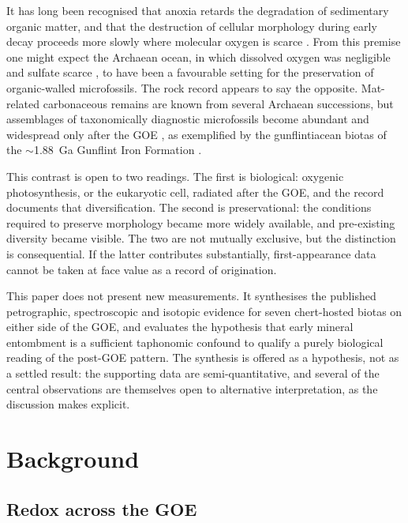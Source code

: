 \documentclass[11pt]{article}
\begin{document}
It has long been recognised that anoxia retards the degradation of sedimentary organic matter, and
that the destruction of cellular morphology during early decay proceeds more slowly where molecular
oxygen is scarce \citep{Canfield1994,Hedges1995}. From this premise one might expect the Archaean
ocean, in which dissolved oxygen was negligible \citep{Pavlov2002} and sulfate scarce
\citep{Habicht2002,Crowe2014}, to have been a favourable setting for the preservation of organic-walled
microfossils. The rock record appears to say the opposite. Mat-related carbonaceous remains are known
from several Archaean successions, but assemblages of taxonomically diagnostic microfossils become
abundant and widespread only after the GOE \citep{Javaux2018,Wacey2014}, as exemplified by the
gunflintiacean biotas of the $\sim$1.88~Ga Gunflint Iron Formation \citep{Lepot2017}.

This contrast is open to two readings. The first is biological: oxygenic photosynthesis, or the
eukaryotic cell, radiated after the GOE, and the record documents that diversification. The second is
preservational: the conditions required to preserve morphology became more widely available, and
pre-existing diversity became visible. The two are not mutually exclusive, but the distinction is
consequential. If the latter contributes substantially, first-appearance data cannot be taken at face
value as a record of origination.

This paper does not present new measurements. It synthesises the published petrographic,
spectroscopic and isotopic evidence for seven chert-hosted biotas on either side of the GOE, and
evaluates the hypothesis that early mineral entombment is a sufficient taphonomic confound to
qualify a purely biological reading of the post-GOE pattern. The synthesis is offered as a
hypothesis, not as a settled result: the supporting data are semi-quantitative, and several of the
central observations are themselves open to alternative interpretation, as the discussion makes
explicit.

\section{Background}

\subsection{Redox across the GOE}
\end{document}
